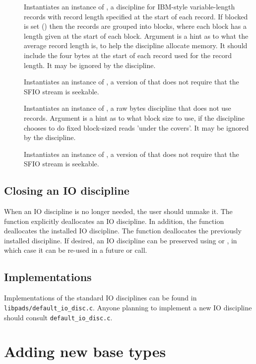 \begin{description}
\item[\small{}]
 Instantiates an instance of , a discipline for IBM-style
 variable-length records with record length specified at the start
 of each record.  If blocked is set () then the records are
 grouped into blocks, where each block has a length given at the
 start of each block.  Argument  is a hint as to what the
 average record length is, to help the discipline allocate memory.
 It should include the four bytes at the start of each record used for
 the record length.  It may be ignored by the discipline.
 

\item[\small{}] Instantiates an instance of
 , a version of  that does not require
 that the SFIO stream is seekable.


\item[\small{}]
Instantiates an instance of , a raw bytes discipline that
does not use records.  Argument  is a hint as to what block size
to use, if the discipline chooses to do fixed block-sized reads
'under the covers'.  It may be ignored by the discipline.


\item[\small{}]
Instantiates an instance of , a version of 
that does not require that the SFIO stream is seekable.


\end{description}



\subsection{Closing an IO discipline}
When an IO discipline is no longer needed, the user should unmake it.
The function  explicitly deallocates an IO
discipline. In addition, the function 
deallocates the installed IO discipline.  
The function  deallocates the previously
installed discipline.
If desired, an IO discipline can be preserved using
 or , in
which case it can be re-used in a future  or
 call. 

\subsection{Implementations}
Implementations of the standard IO disciplines can be found in
\texttt{libpads/default\_io\_disc.c}.  Anyone planning to implement a new IO
discipline should consult \texttt{default\_io\_disc.c}.



\section{Adding new base types}
\label{sec:library-adding-new-base-types}
